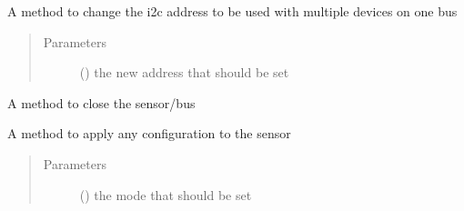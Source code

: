 \documentclass[letterpaper,10pt,english]{sphinxmanual}
\begin{document}
\begin{fulllineitems}
\begin{fulllineitems}
\end{fulllineitems}


\begin{fulllineitems}
\label{\detokenize{sim_interfaces:lib.sim_interfaces.SimSensor.change_addr}}
A method to change the i2c address to be used with multiple devices on one bus
\begin{quote}\begin{description}
\item[{Parameters}] \leavevmode
{} () \textendash{} the new address that should be set

\end{description}\end{quote}

\end{fulllineitems}


\begin{fulllineitems}
\label{\detokenize{sim_interfaces:lib.sim_interfaces.SimSensor.close}}
A method to close the sensor/bus

\end{fulllineitems}


\begin{fulllineitems}
\label{\detokenize{sim_interfaces:lib.sim_interfaces.SimSensor.configure}}
A method to apply any configuration to the sensor
\begin{quote}\begin{description}
\item[{Parameters}] \leavevmode
{} () \textendash{} the mode that should be set


\end{description}
\end{quote}
\end{fulllineitems}
\end{fulllineitems}
\end{document}
